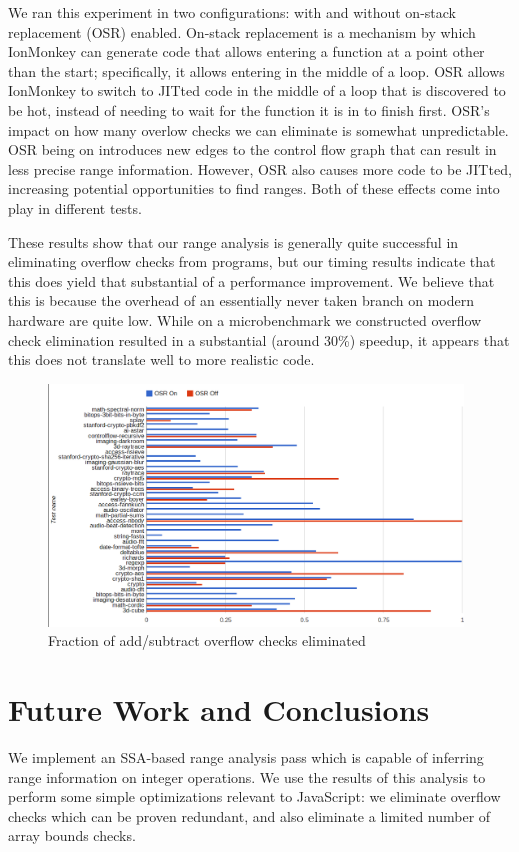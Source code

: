 \documentclass{article}
\begin{document}
We ran this experiment in two configurations: with and without
on-stack replacement (OSR) enabled. On-stack replacement is a
mechanism by which IonMonkey can generate code that allows entering a
function at a point other than the start; specifically, it allows
entering in the middle of a loop. OSR allows IonMonkey to switch to
JITted code in the middle of a loop that is discovered to be hot,
instead of needing to wait for the function it is in to finish
first. OSR's impact on how many overlow checks we can eliminate is
somewhat unpredictable. OSR being on introduces new edges to the
control flow graph that can result in less precise range
information. However, OSR also causes more code to be JITted,
increasing potential opportunities to find ranges. Both of these
effects come into play in different tests. 

These results show that our range analysis is generally quite
successful in eliminating overflow checks from programs, but our
timing results indicate that this does yield that substantial of a
performance improvement. We believe that this is because the overhead
of an essentially never taken branch on modern hardware are quite
low. While on a microbenchmark we constructed overflow check
elimination resulted in a substantial (around 30\%) speedup, it appears that
this does not translate well to more realistic code.

\begin{figure}[!ht]
\centering
\includegraphics[width=0.98\textwidth]{counts_graph.png}
\caption{Fraction of add/subtract overflow checks eliminated}
\label{fig:count}
\end{figure}


\section{Future Work and Conclusions}
We implement an SSA-based range analysis pass which is capable of
inferring range information on integer operations. We use the results
of this analysis to perform some simple optimizations relevant to
JavaScript: we eliminate overflow checks which can be proven
redundant, and also eliminate a limited number of array bounds checks.
\end{document}
